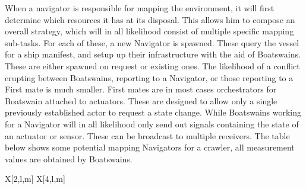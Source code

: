 When a navigator is responsible for mapping the environment, it will first determine which resources it has at its
disposal. This allows him to compose an overall strategy, which will in all likelihood consist of multiple specific
mapping sub-tasks. For each of these, a new Navigator is spawned. These query the vessel for a ship manifest, and setup
up their infrastructure with the aid of Boatswains. These are either spawned on request or existing ones. The likelihood
of a conflict erupting between Boatswains, reporting to a Navigator, or those reporting to a First mate is much smaller.
First mates are in most cases orchestrators for Boatswain attached to actuators. These are designed to allow only a
single previously established actor to request a state change. While Boatswains working for a Navigator will in all
likelihood only send out signals containing the state of an actuator or sensor. These can be broadcast to multiple
receivers. The table below shows some potential mapping Navigators for a crawler, all measurement values are obtained
by Boatswains.

\begin{RoyalTable}{X[2,l,m] X[4,l,m]}
\end{RoyalTable}

